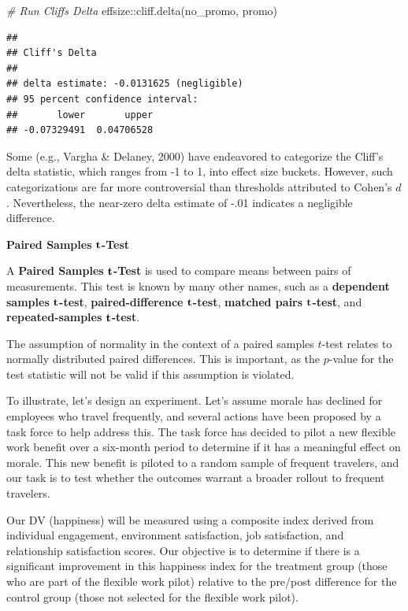 \documentclass[
]{book}
\newenvironment{Shaded}{\begin{snugshade}}{\end{snugshade}}
\newcommand{\CommentTok}[1]{\textcolor[rgb]{0.56,0.35,0.01}{\textit{#1}}}
\newcommand{\FunctionTok}[1]{\textcolor[rgb]{0.00,0.00,0.00}{#1}}
\newcommand{\NormalTok}[1]{#1}
\newcommand{\SpecialCharTok}[1]{\textcolor[rgb]{0.00,0.00,0.00}{#1}}
\begin{document}
\begin{Shaded}
\begin{Highlighting}[]
\CommentTok{\# Run Cliff\textquotesingle{}s Delta}
\NormalTok{effsize}\SpecialCharTok{::}\FunctionTok{cliff.delta}\NormalTok{(no\_promo, promo)}
\end{Highlighting}
\end{Shaded}

\begin{verbatim}
## 
## Cliff's Delta
## 
## delta estimate: -0.0131625 (negligible)
## 95 percent confidence interval:
##       lower       upper 
## -0.07329491  0.04706528
\end{verbatim}

Some (e.g., Vargha \& Delaney, 2000) have endeavored to categorize the Cliff's delta statistic, which ranges from -1 to 1, into effect size buckets. However, such categorizations are far more controversial than thresholds attributed to Cohen's \(d\). Nevertheless, the near-zero delta estimate of -.01 indicates a negligible difference.

\textbf{Paired Samples} \(\textbf t\)\textbf{-Test}

A \textbf{Paired Samples }\(\textbf t\)\textbf{-Test} is used to compare means between pairs of measurements. This test is known by many other names, such as a \textbf{dependent samples} \(\textbf t\)\textbf{-test}, \textbf{paired-difference} \(\textbf t\)\textbf{-test}, \textbf{matched pairs} \(\textbf t\)\textbf{-test}, and \textbf{repeated-samples} \(\textbf t\)\textbf{-test}.

The assumption of normality in the context of a paired samples \(t\)-test relates to normally distributed paired differences. This is important, as the \(p\)-value for the test statistic will not be valid if this assumption is violated.

To illustrate, let's design an experiment. Let's assume morale has declined for employees who travel frequently, and several actions have been proposed by a task force to help address this. The task force has decided to pilot a new flexible work benefit over a six-month period to determine if it has a meaningful effect on morale. This new benefit is piloted to a random sample of frequent travelers, and our task is to test whether the outcomes warrant a broader rollout to frequent travelers.

Our DV (happiness) will be measured using a composite index derived from individual engagement, environment satisfaction, job satisfaction, and relationship satisfaction scores. Our objective is to determine if there is a significant improvement in this happiness index for the treatment group (those who are part of the flexible work pilot) relative to the pre/post difference for the control group (those not selected for the flexible work pilot).
\end{document}
